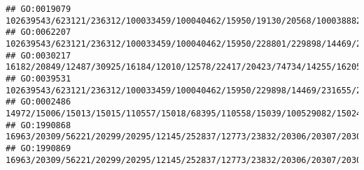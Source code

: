 \documentclass[
]{article}
\begin{document}
\begin{verbatim}
## GO:0019079                                                                                                                                                                                                                                                    102639543/623121/236312/100033459/100040462/15950/19130/20568/100038882/23962/231655/246728/246727/23961/23960/246730/68713/69550/20307/20304/58185/17858
## GO:0062207                                                                                                                                                                                                                                   102639543/623121/236312/100033459/100040462/15950/228801/229898/14469/231655/20128/54123/234311/81897/80861/382551/58185/16364/54483/15511/224762/224840/12475/71398/12229
## GO:0030217                                                                                                                                                                                     16182/20849/12487/30925/16184/12010/12578/22417/20423/74734/14255/16205/83408/12525/12515/12502/12500/12501/12047/67596/16160/12775/58185/16364/110168/321019/12458/15001/14998/14960/100038862/624681/16149/20371/16186
## GO:0039531                                                                                                                                                                                                                                                            102639543/623121/236312/100033459/100040462/15950/229898/14469/231655/20128/234311/81897/80861/382551/58185/54483/15511/224762/224840/71398/12229
## GO:0002486                                                                                                                                                                                                                                                                                                                         14972/15006/15013/15015/110557/15018/68395/110558/15039/100529082/15024/667977/14990
## GO:1990868                                                                                                                                                                                                                                                                                                 16963/20309/56221/20299/20295/12145/252837/12773/23832/20306/20307/20304/20303/12775/12777/19876/12458/12766
## GO:1990869                                                                                                                                                                                                                                                                                                 16963/20309/56221/20299/20295/12145/252837/12773/23832/20306/20307/20304/20303/12775/12777/19876/12458/12766

\end{verbatim}
\end{document}
